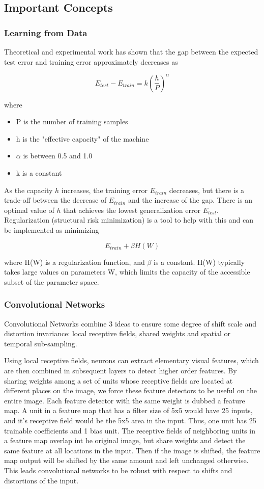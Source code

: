 \documentclass[11pt]{article}
\theoremstyle{definition}
\begin{document}
\subsection{Important Concepts}
\subsubsection{Learning from Data}
Theoretical and experimental work has shown that the gap between the expected test error and training error approximately decreases as 

\[ E_{test} - E_{train} = k \left(\frac{h}{P}\right)^{\alpha}\]

where

\begin{itemize}
\item P is the number of training samples
\item h is the "effective capacity" of the machine
\item $\alpha$ is between 0.5 and 1.0
\item k is a constant
\end{itemize}

As the capacity $h$ increases, the training error $E_{train}$ decreases, but there is a trade-off between the decrease of $E_{train}$ and the increase of the gap. There is an optimal value of $h$ that achieves the lowest generalization error $E_{test}$. Regularization (structural risk minimization) is a tool to help with this and can be implemented as minimizing

\[E_{train} + \beta H(W) \]

where H(W) is a regularization function, and $\beta$ is a constant. H(W) typically takes large values on parameters W, which limits the capacity of the accessible subset of the parameter space. 

\subsubsection{Convolutional Networks}
Convolutional Networks combine 3 ideas to ensure some degree of shift scale and distortion invariance: local receptive fields, shared weights and spatial or temporal sub-sampling.

\bigskip

Using local receptive fields, neurons can extract elementary visual features, which are then combined in subsequent layers to detect higher order features. By sharing weights among a set of units whose receptive fields are located at different places on the image, we force these feature detectors to be useful on the entire image. Each feature detector with the same weight is dubbed a feature map. A unit in a feature map that has a filter size of 5x5 would have 25 inputs, and it's receptive field would be the 5x5 area in the input. Thus, one unit has 25 trainable coefficients and 1 bias unit. The receptive fields of neighboring units in a feature map overlap int he original image, but share weights and detect the same feature at all locations in the input. Then if the image is shifted, the feature map output will be shifted by the same amount and left unchanged otherwise. This leads convolutional networks to be robust with respect to shifts and distortions of the input. 
\end{document}
